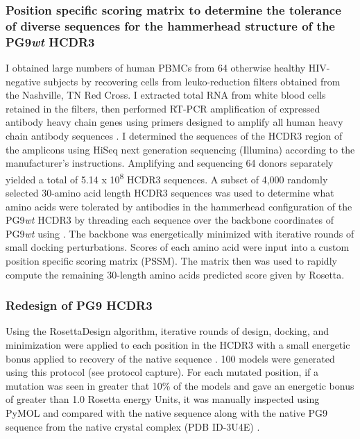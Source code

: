 \subsubsection{Position specific scoring matrix to determine the tolerance of diverse sequences for the hammerhead structure of the PG9\textit{wt} HCDR3}
I obtained large numbers of human PBMCs from 64 otherwise healthy HIV-negative subjects by recovering cells from leuko-reduction filters obtained from the Nashville, TN Red Cross. I extracted total RNA from white blood cells retained in the filters, then performed RT-PCR amplification of expressed antibody heavy chain genes using primers designed to amplify all human heavy chain antibody sequences \citep{Briney:2012ib}. I determined the sequences of the HCDR3 region of the amplicons using HiSeq next generation sequencing (Illumina) according to the manufacturer’s instructions. Amplifying and sequencing 64 donors separately yielded a total of 5.14 x 10\textsuperscript{8} HCDR3 sequences. A subset of 4,000 randomly selected 30-amino acid length HCDR3 sequences was used to determine what amino acids were tolerated by antibodies in the hammerhead configuration of the PG9\textit{wt} HCDR3 by threading each sequence over the backbone coordinates of PG9\textit{wt} using \rosetta. The backbone was energetically minimized with iterative rounds of small docking perturbations. Scores of each amino acid were input into a custom position specific scoring matrix (PSSM). The matrix then was used to rapidly compute the remaining 30-length amino acids predicted score given by Rosetta.

\subsubsection{Redesign of PG9 HCDR3}
Using the RosettaDesign algorithm, iterative rounds of design, docking, and minimization were applied to each position in the HCDR3 with a small energetic bonus applied to recovery of the native sequence \citep{Kuhlman:2000tc}. 100 models were generated using this protocol (see protocol capture). For each mutated position, if a mutation was seen in greater that 10\% of the models and gave an energetic bonus of greater than 1.0 Rosetta energy Units, it was manually inspected using PyMOL and compared with the native sequence along with the native PG9 sequence from the native crystal complex (PDB ID-3U4E) \citep{McLellan:2011dg}.



